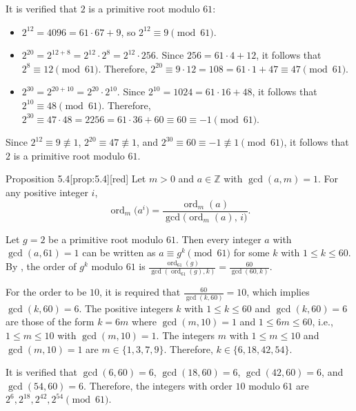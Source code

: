 \begin{enumerate}
\begin{subanswer}
    It is verified that $2$ is a primitive root modulo $61$:
    \begin{itemize}
      \item $2^{12} = 4096 = 61 \cdot 67 + 9$, so $2^{12} \equiv 9 \pmod{61}$.
      \item $2^{20} = 2^{12+8} = 2^{12} \cdot 2^8 = 2^{12} \cdot 256$. Since $256 = 61 \cdot 4 + 12$, it follows that $2^8 \equiv 12 \pmod{61}$.
      Therefore, $2^{20} \equiv 9 \cdot 12 = 108 = 61 \cdot 1 + 47 \equiv 47 \pmod{61}$.
      \item $2^{30} = 2^{20+10} = 2^{20} \cdot 2^{10}$. Since $2^{10} = 1024 = 61 \cdot 16 + 48$, it follows that $2^{10} \equiv 48 \pmod{61}$.
      Therefore, $2^{30} \equiv 47 \cdot 48 = 2256 = 61 \cdot 36 + 60 \equiv 60 \equiv -1 \pmod{61}$.
    \end{itemize}
    Since $2^{12} \equiv 9 \not\equiv 1$, $2^{20} \equiv 47 \not\equiv 1$, and $2^{30} \equiv 60 \equiv -1 \not\equiv 1 \pmod{61}$, it follows that $2$ is a primitive root modulo $61$.
    
    \begin{define}{Proposition 5.4}[prop:5.4][red]
      Let $m>0$ and $a\in\mathbb{Z}$ with $\gcd(a,m)=1$. For any positive integer $i$,
      \[
      \operatorname{ord}_m\!\bigl(a^i\bigr)=\frac{\operatorname{ord}_m(a)}{\gcd\bigl(\operatorname{ord}_m(a),\,i\bigr)}.
      \]
    \end{define}

    Let $g = 2$ be a primitive root modulo $61$. Then every integer $a$ with $\gcd(a, 61) = 1$ can be written as $a \equiv g^k \pmod{61}$ for some $k$ with $1 \leq k \leq 60$.
    By , the order of $g^k$ modulo $61$ is $\frac{\operatorname{ord}_{61}(g)}{\gcd(\operatorname{ord}_{61}(g), k)} = \frac{60}{\gcd(60, k)}$.
    
    For the order to be $10$, it is required that $\frac{60}{\gcd(k, 60)} = 10$, which implies $\gcd(k, 60) = 6$.
    The positive integers $k$ with $1 \leq k \leq 60$ and $\gcd(k, 60) = 6$ are those of the form $k = 6m$ where $\gcd(m, 10) = 1$ and $1 \leq 6m \leq 60$, i.e., $1 \leq m \leq 10$ with $\gcd(m, 10) = 1$.
    The integers $m$ with $1 \leq m \leq 10$ and $\gcd(m, 10) = 1$ are $m \in \{1, 3, 7, 9\}$.
    Therefore, $k \in \{6, 18, 42, 54\}$.
    
    It is verified that $\gcd(6, 60) = 6$, $\gcd(18, 60) = 6$, $\gcd(42, 60) = 6$, and $\gcd(54, 60) = 6$.
    Therefore, the integers with order $10$ modulo $61$ are $2^6, 2^{18}, 2^{42}, 2^{54} \pmod{61}$.
    

\end{subanswer}
\end{enumerate}
